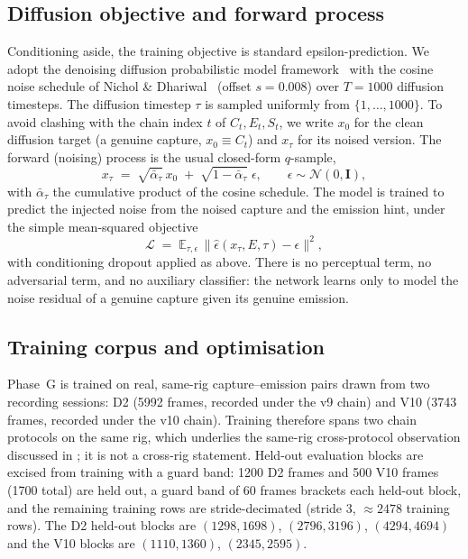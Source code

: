 \subsection{Diffusion objective and forward process}

Conditioning aside, the training objective is standard epsilon-prediction. We adopt the denoising diffusion probabilistic model framework~\cite{ho2020ddpm} with the cosine noise schedule of Nichol \& Dhariwal~\cite{nicholdhariwal2021} (offset $s=0.008$) over $T=1000$ diffusion timesteps. The diffusion timestep $\tau$ is sampled uniformly from $\{1,\dots,1000\}$. To avoid clashing with the chain index $t$ of $C_t, E_t, S_t$, we write $x_0$ for the clean diffusion target (a genuine capture, $x_0 \equiv C_t$) and $x_\tau$ for its noised version. The forward (noising) process is the usual closed-form $q$-sample,
\[
x_\tau \;=\; \sqrt{\bar{\alpha}_\tau}\,x_0 \;+\; \sqrt{1-\bar{\alpha}_\tau}\;\epsilon,
\qquad \epsilon \sim \mathcal{N}(0,\mathbf{I}),
\]
with $\bar{\alpha}_\tau$ the cumulative product of the cosine schedule. The model is trained to predict the injected noise from the noised capture and the emission hint, under the simple mean-squared objective
\[
\mathcal{L} \;=\; \mathbb{E}_{\tau,\epsilon}\,\big\lVert \hat{\epsilon}(x_\tau, E, \tau) - \epsilon \big\rVert^2,
\]
with conditioning dropout applied as above. There is no perceptual term, no adversarial term, and no auxiliary classifier: the network learns only to model the noise residual of a genuine capture given its genuine emission.

\subsection{Training corpus and optimisation}

Phase~G is trained on real, same-rig capture--emission pairs drawn from two recording sessions: D2 (\num{5992} frames, recorded under the v9 chain) and V10 (\num{3743} frames, recorded under the v10 chain). Training therefore spans two chain protocols on the same rig, which underlies the same-rig cross-protocol observation discussed in ; it is not a cross-rig statement. Held-out evaluation blocks are excised from training with a guard band: \num{1200} D2 frames and \num{500} V10 frames (\num{1700} total) are held out, a guard band of \num{60} frames brackets each held-out block, and the remaining training rows are stride-decimated (stride 3, $\approx\num{2478}$ training rows). The D2 held-out blocks are $(1298,1698)$, $(2796,3196)$, $(4294,4694)$ and the V10 blocks are $(1110,1360)$, $(2345,2595)$.

